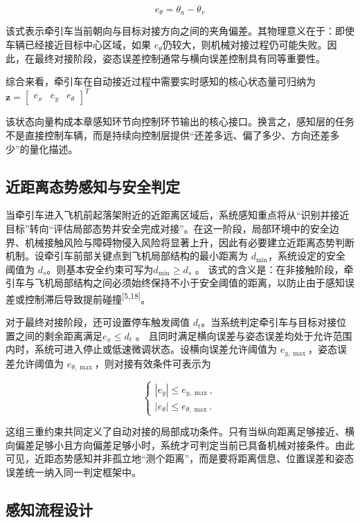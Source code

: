 \documentclass[UTF8,a4paper,12pt]{ctexart}
\begin{document}
\[e_{\theta} = \theta_{a} - \theta_{v}\]

该式表示牵引车当前朝向与目标对接方向之间的夹角偏差。其物理意义在于：即使车辆已经接近目标中心区域，如果 \(e_{\theta}\)仍较大，则机械对接过程仍可能失败。因此，在最终对接阶段，姿态误差控制通常与横向误差控制具有同等重要性。

综合来看，牵引车在自动接近过程中需要实时感知的核心状态量可归纳为\(\mathbf{z} = \begin{bmatrix}
e_{x} & e_{y} & e_{\theta}
\end{bmatrix}^{T}
\)

该状态向量构成本章感知环节向控制环节输出的核心接口。换言之，感知层的任务不是直接控制车辆，而是持续向控制层提供``还差多远、偏了多少、方向还差多少''的量化描述。

\subsection{近距离态势感知与安全判定}\label{_Toc228997191}

当牵引车进入飞机前起落架附近的近距离区域后，系统感知重点将从``识别并接近目标''转向``评估局部态势并安全完成对接''。在这一阶段，局部环境中的安全边界、机械接触风险与障碍物侵入风险将显著上升，因此有必要建立近距离态势判断机制。设牵引车前部关键点到飞机局部结构的最小距离为 \(d_{\min}\)，系统设定的安全阈值为 \(d_{s}\)。则基本安全约束可写为\(d_{\min} \geq d_{s}\) 。\(
\) 该式的含义是：在非接触阶段，牵引车与飞机局部结构之间必须始终保持不小于安全阈值的距离，以防止由于感知误差或控制滞后导致提前碰撞\textsuperscript{[5,18]}。

对于最终对接阶段，还可设置停车触发阈值 \(d_{t}\)。当系统判定牵引车与目标对接位置之间的剩余距离满足\(e_{x} \leq d_{t}\) 。\(
\) 且同时满足横向误差与姿态误差均处于允许范围内时，系统可进入停止或低速微调状态。设横向误差允许阈值为 \(e_{y,\max}\)，姿态误差允许阈值为 \(e_{\theta,\max}\)，则对接有效条件可表示为

\[
\begin{cases}
|e_y|\leq e_{y,\max},\\
|e_\theta|\leq e_{\theta,\max}.
\end{cases}
\]

这组三重约束共同定义了自动对接的局部成功条件。只有当纵向距离足够接近、横向偏差足够小且方向偏差足够小时，系统才可判定当前已具备机械对接条件。由此可见，近距态势感知并非孤立地``测个距离''，而是要将距离信息、位置误差和姿态误差统一纳入同一判定框架中。

\subsection{感知流程设计}\label{_Toc228997192}
\end{document}
